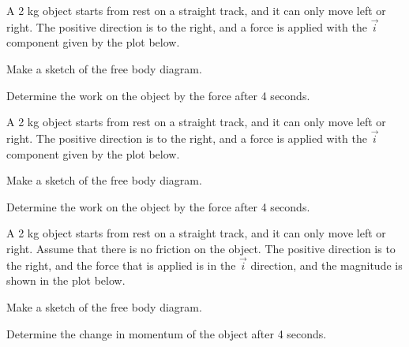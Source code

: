 \begin{problem}
\item A 2 kg object starts from rest on a straight track, and it can
  only move left or right. The positive direction is to the right, and
  a force is applied with the $\vec{i}$ component given by the plot
  below.

  \scalebox{0.5}{}

  \begin{subproblem}
    \item Make a sketch of the free body diagram.
      \vspace{4em}
    \item Determine the work on the object by the force after 4
      seconds.
      \vfill
  \end{subproblem}
  \clearpage

\item A 2 kg object starts from rest on a straight track, and it can
  only move left or right. The positive direction is to the right, and
  a force is applied with the $\vec{i}$ component given by the plot
  below.

  \scalebox{0.5}{}

  \begin{subproblem}
    \item Make a sketch of the free body diagram.
      \vspace{4em}
    \item Determine the work on the object by the force after 4
      seconds.
      \vfill
  \end{subproblem}
  \clearpage

\item A 2 kg object starts from rest on a straight track, and it can
  only move left or right. Assume that there is no friction on the
  object. The positive direction is to the right, and the force that
  is applied is in the $\vec{i}$ direction, and the magnitude is shown
  in the plot below.

  \scalebox{0.5}{}

  \begin{subproblem}
    \item Make a sketch of the free body diagram.
      \vspace{4em}
    \item Determine the change in momentum of the object after 4
      seconds.
      \vfill
  \end{subproblem}

\end{problem}


